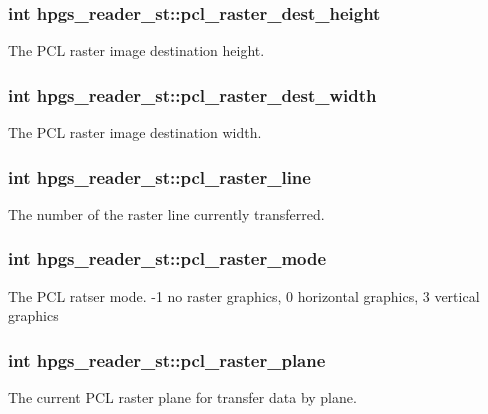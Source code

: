 \subsubsection[{pcl\_\-raster\_\-dest\_\-height}]{\setlength{\rightskip}{0pt plus 5cm}int {\bf hpgs\_\-reader\_\-st::pcl\_\-raster\_\-dest\_\-height}}\label{structhpgs__reader__st_aa0cea59f03a62d822030a748d0250244}
The PCL raster image destination height. 
\subsubsection[{pcl\_\-raster\_\-dest\_\-width}]{\setlength{\rightskip}{0pt plus 5cm}int {\bf hpgs\_\-reader\_\-st::pcl\_\-raster\_\-dest\_\-width}}\label{structhpgs__reader__st_a710d83626984533d90f749e47d33ccd2}
The PCL raster image destination width. 
\subsubsection[{pcl\_\-raster\_\-line}]{\setlength{\rightskip}{0pt plus 5cm}int {\bf hpgs\_\-reader\_\-st::pcl\_\-raster\_\-line}}\label{structhpgs__reader__st_a6ba17133f382263f5cbc5545be459aed}
The number of the raster line currently transferred. 
\subsubsection[{pcl\_\-raster\_\-mode}]{\setlength{\rightskip}{0pt plus 5cm}int {\bf hpgs\_\-reader\_\-st::pcl\_\-raster\_\-mode}}\label{structhpgs__reader__st_a94717a915f04e38ccf6954f79a0aed76}
The PCL ratser mode. -\/1 no raster graphics, 0 horizontal graphics, 3 vertical graphics 
\subsubsection[{pcl\_\-raster\_\-plane}]{\setlength{\rightskip}{0pt plus 5cm}int {\bf hpgs\_\-reader\_\-st::pcl\_\-raster\_\-plane}}\label{structhpgs__reader__st_a6601c9ae20b7b0eb8282c64dda3481ba}
The current PCL raster plane for transfer data by plane. 
